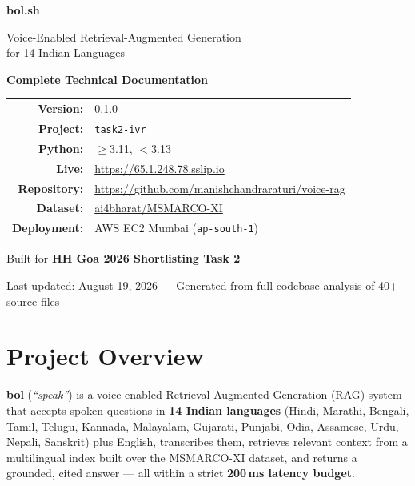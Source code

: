 \documentclass[12pt,a4paper]{article}
\begin{document}
\begin{titlepage}
\centering
\vspace*{2cm}

{\Huge\bfseries\color{maroon!80!black} bol.sh\par}
\vspace{0.5cm}
{\LARGE Voice-Enabled Retrieval-Augmented Generation\\for 14 Indian Languages\par}
\vspace{1.5cm}
{\Large\textbf{Complete Technical Documentation}\par}
\vspace{2cm}

\begin{tabular}{rl}
\textbf{Version:} & 0.1.0 \\
\textbf{Project:} & \texttt{task2-ivr} \\
\textbf{Python:} & $\geq$3.11, $<$3.13 \\
\textbf{Live:} & \url{https://65.1.248.78.sslip.io} \\
\textbf{Repository:} & \url{https://github.com/manishchandraraturi/voice-rag} \\
\textbf{Dataset:} & \href{https://huggingface.co/datasets/ai4bharat/MSMARCO-XI}{ai4bharat/MSMARCO-XI} \\
\textbf{Deployment:} & AWS EC2 Mumbai (\texttt{ap-south-1}) \\
\end{tabular}

\vspace{2cm}
{\large Built for \textbf{HH Goa 2026 Shortlisting Task 2}\par}

\vfill
{\small Last updated: August 19, 2026 --- Generated from full codebase analysis of 40+ source files}
\end{titlepage}

\tableofcontents
\newpage

\section{Project Overview}

\textbf{bol} (\textit{``speak''}) is a voice-enabled Retrieval-Augmented Generation (RAG) system that accepts spoken questions in \textbf{14 Indian languages} (Hindi, Marathi, Bengali, Tamil, Telugu, Kannada, Malayalam, Gujarati, Punjabi, Odia, Assamese, Urdu, Nepali, Sanskrit) plus English, transcribes them, retrieves relevant context from a multilingual index built over the MSMARCO-XI dataset, and returns a grounded, cited answer --- all within a strict \textbf{200\,ms latency budget}.
\end{document}
